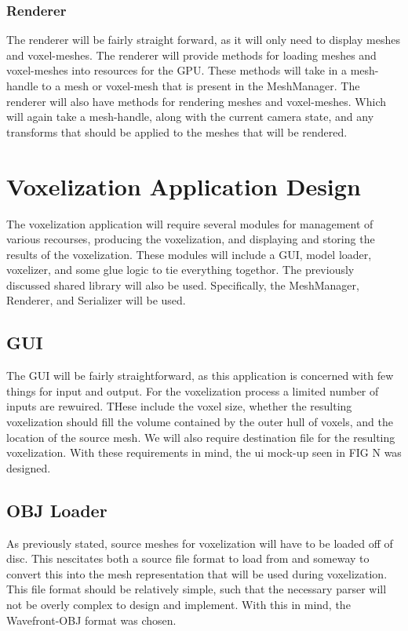 \subsubsection{Renderer}

The renderer will be fairly straight forward, as it will only need to display meshes and 
voxel-meshes. The renderer will provide methods for loading meshes and voxel-meshes into resources 
for the GPU. These methods will take in a mesh-handle to a mesh or voxel-mesh that is present in the
MeshManager. The renderer will also have methods for rendering meshes and voxel-meshes. Which will 
again take a mesh-handle, along with the current camera state, and any transforms that should be 
applied to the meshes that will be rendered.

\section{Voxelization Application Design}

The voxelization application will require several modules for management of various recourses, producing the
voxelization, and displaying and storing the results of the voxelization. These modules will include a GUI,
model loader, voxelizer, and some glue logic to tie everything togethor. The previously discussed shared library
will also be used. Specifically, the MeshManager, Renderer, and Serializer will be used.

\subsection{GUI}

The GUI will be fairly straightforward, as this application is concerned with few things for input and output.
For the voxelization process a limited number of inputs are rewuired. THese include the voxel size, whether the
resulting voxelization should fill the volume contained by the outer hull of voxels, and the location of the
source mesh. We will also require destination file for the resulting voxelization. With these requirements in
mind, the ui mock-up seen in FIG N was designed.

\subsection{OBJ Loader}

As previously stated, source meshes for voxelization will have to be loaded off of disc. This nescitates both a
source file format to load from and someway to convert this into the mesh representation that will be used
during voxelization. This file format should be relatively simple, such that the necessary parser will not be
overly complex to design and implement. With this in mind, the Wavefront-OBJ format was chosen.

